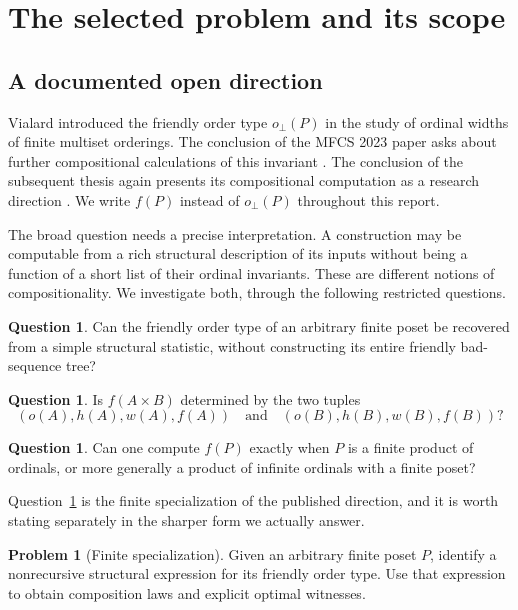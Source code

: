 \documentclass[11pt,letterpaper]{article}
\theoremstyle{definition}
\newtheorem{question}[theorem]{Question}
\newtheorem{problem}[theorem]{Problem}
\theoremstyle{remark}
\begin{document}
\section{The selected problem and its scope}\label{sec:scope}

\subsection{A documented open direction}
Vialard introduced the friendly order type $o_\perp(P)$ in the study of
ordinal widths of finite multiset orderings. The conclusion of the MFCS
2023 paper asks about further compositional calculations of this invariant
\cite[Conclusion, p.~87:11]{Vialard2023}. The conclusion of the subsequent
thesis again presents its compositional computation as a research direction
\cite[Conclusion, p.~109]{VialardThesis}. We write $f(P)$ instead of
$o_\perp(P)$ throughout this report.

The broad question needs a precise interpretation. A construction may be
computable from a rich structural description of its inputs without being
a function of a short list of their ordinal invariants. These are different
notions of compositionality. We investigate both, through the following
restricted questions.

\begin{question}\label{q:finite}
Can the friendly order type of an arbitrary finite poset be recovered
from a simple structural statistic, without constructing its entire
friendly bad-sequence tree?
\end{question}

\begin{question}\label{q:scalar}
Is $f(A\times B)$ determined by the two tuples
\[
 (o(A),h(A),w(A),f(A))\quad\text{and}\quad(o(B),h(B),w(B),f(B))?
\]
\end{question}

\begin{question}\label{q:ordinal}
Can one compute $f(P)$ exactly when $P$ is a finite product of ordinals,
or more generally a product of infinite ordinals with a finite poset?
\end{question}

Question~\ref{q:finite} is the finite specialization of the published
direction, and it is worth stating separately in the sharper form we actually
answer.

\begin{problem}[Finite specialization]\label{prob:finite}
Given an arbitrary finite poset $P$, identify a nonrecursive structural
expression for its friendly order type. Use that expression to obtain
composition laws and explicit optimal witnesses.
\end{problem}
\end{document}
